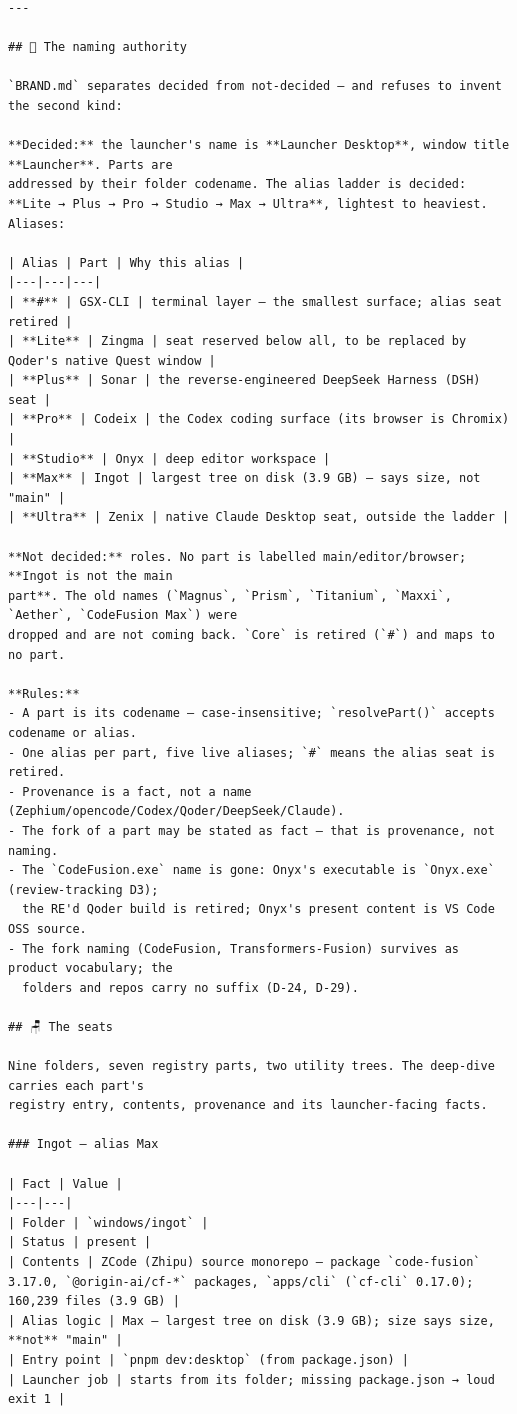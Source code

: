 \begin{Verbatim}[breaklines,breakanywhere,fontsize=\footnotesize]
---

## 🪪 The naming authority

`BRAND.md` separates decided from not-decided — and refuses to invent the second kind:

**Decided:** the launcher's name is **Launcher Desktop**, window title **Launcher**. Parts are
addressed by their folder codename. The alias ladder is decided:
**Lite → Plus → Pro → Studio → Max → Ultra**, lightest to heaviest. Aliases:

| Alias | Part | Why this alias |
|---|---|---|
| **#** | GSX-CLI | terminal layer — the smallest surface; alias seat retired |
| **Lite** | Zingma | seat reserved below all, to be replaced by Qoder's native Quest window |
| **Plus** | Sonar | the reverse-engineered DeepSeek Harness (DSH) seat |
| **Pro** | Codeix | the Codex coding surface (its browser is Chromix) |
| **Studio** | Onyx | deep editor workspace |
| **Max** | Ingot | largest tree on disk (3.9 GB) — says size, not "main" |
| **Ultra** | Zenix | native Claude Desktop seat, outside the ladder |

**Not decided:** roles. No part is labelled main/editor/browser; **Ingot is not the main
part**. The old names (`Magnus`, `Prism`, `Titanium`, `Maxxi`, `Aether`, `CodeFusion Max`) were
dropped and are not coming back. `Core` is retired (`#`) and maps to no part.

**Rules:**
- A part is its codename — case-insensitive; `resolvePart()` accepts codename or alias.
- One alias per part, five live aliases; `#` means the alias seat is retired.
- Provenance is a fact, not a name (Zephium/opencode/Codex/Qoder/DeepSeek/Claude).
- The fork of a part may be stated as fact — that is provenance, not naming.
- The `CodeFusion.exe` name is gone: Onyx's executable is `Onyx.exe` (review-tracking D3);
  the RE'd Qoder build is retired; Onyx's present content is VS Code OSS source.
- The fork naming (CodeFusion, Transformers-Fusion) survives as product vocabulary; the
  folders and repos carry no suffix (D-24, D-29).

## 🪑 The seats

Nine folders, seven registry parts, two utility trees. The deep-dive carries each part's
registry entry, contents, provenance and its launcher-facing facts.

### Ingot — alias Max

| Fact | Value |
|---|---|
| Folder | `windows/ingot` |
| Status | present |
| Contents | ZCode (Zhipu) source monorepo — package `code-fusion` 3.17.0, `@origin-ai/cf-*` packages, `apps/cli` (`cf-cli` 0.17.0); 160,239 files (3.9 GB) |
| Alias logic | Max — largest tree on disk (3.9 GB); size says size, **not** "main" |
| Entry point | `pnpm dev:desktop` (from package.json) |
| Launcher job | starts from its folder; missing package.json → loud exit 1 |


\end{Verbatim}
